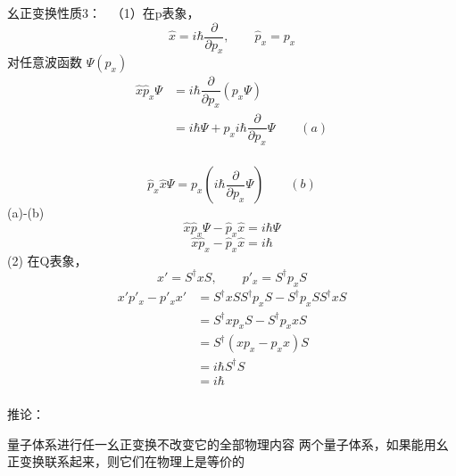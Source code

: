 \begin{frame} {幺正变换性质3：}
    \例[7.幺正变换不改变物理规律，现已知在 x 表象中的基本对易关系$xp_x-p_x x =i\hbar$， 试求它在p表象中的形式，然后证明这种对易关系不随表象发生变化]{}
    \解 ~（1）在p表象， $$ \hat{x}=i\hbar\dfrac{\partial}{\partial p_x}, \qquad \hat{p}_x=p_x $$
     对任意波函数 $\Psi(p_x)$
    \begin{equation*}
        \begin{split}
            \hat{x}\hat{p}_x\Psi &= i\hbar\dfrac{\partial}{\partial p_x} (p_x \Psi )\\
            &= i\hbar\Psi + p_xi\hbar\dfrac{\partial}{\partial p_x}\Psi \qquad (a)\\
        \end{split} 
    \end{equation*} 

\end{frame}  
\begin{frame} 
    $$\hat{p}_x\hat{x}\Psi = p_x(i\hbar\dfrac{\partial}{\partial p_x}\Psi) \qquad (b)$$
    (a)-(b)
    $$\hat{x}\hat{p}_x\Psi-\hat{p}_x\hat{x}=i\hbar\Psi$$
    $$\hat{x}\hat{p}_x-\hat{p}_x\hat{x}=i\hbar$$
    (2) 在Q表象，$$ x'= S^\dagger x S, \qquad p'_x= S^\dagger p_x S $$
    \begin{equation*}
        \begin{split}
        x'p'_x-p'_x x' &= S^\dagger x S S^\dagger p_x S - S^\dagger p_x S S^\dagger x S \\
        &= S^\dagger x p_x S - S^\dagger p_x x S \\
        &= S^\dagger (x p_x -  p_x x) S \\
        &= i\hbar S^\dagger S \\
        &= i\hbar \\
        \end{split} 
    \end{equation*} 
\end{frame}  
\begin{frame}
    \begin{tcolorbox2}{推论：}
       \begin{enumerate}
           \Item 量子体系进行任一幺正变换不改变它的全部物理内容
           \Item 两个量子体系，如果能用幺正变换联系起来，则它们在物理上是等价的
       \end{enumerate} 
    \end{tcolorbox2}
\end{frame}

